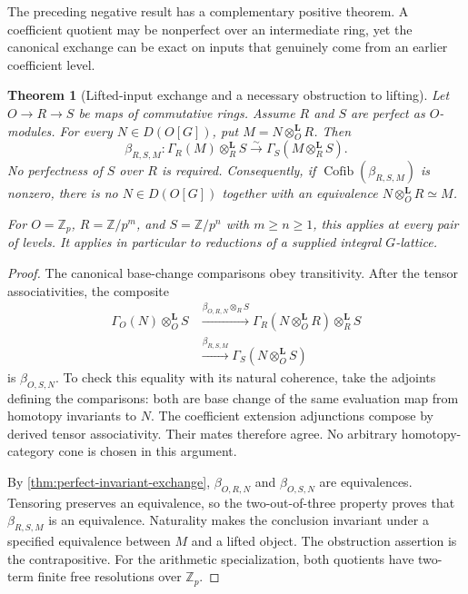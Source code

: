 \documentclass[11pt]{article}
\newtheorem{theorem}{Theorem}[section]
\theoremstyle{definition}
\theoremstyle{remark}
\newcommand{\Cofib}{\operatorname{Cofib}}
\begin{document}
The preceding negative result has a complementary positive theorem. A coefficient quotient may be nonperfect over an intermediate ring, yet the canonical exchange can be exact on inputs that genuinely come from an earlier coefficient level.

\begin{theorem}[Lifted-input exchange and a necessary obstruction to lifting]\label{thm:lifted-input-exchange}
Let $O\to R\to S$ be maps of commutative rings. Assume $R$ and $S$ are perfect as $O$-modules. For every $N\in D(O[G])$, put $M=N\otimes_O^{\mathbf L}R$. Then
\[
 \boxed{\beta_{R,S,M}:\Gamma_R(M)\otimes_R^{\mathbf L}S
 \xrightarrow{\sim}\Gamma_S(M\otimes_R^{\mathbf L}S).}
\]
No perfectness of $S$ over $R$ is required. Consequently, if $\Cofib(\beta_{R,S,M})$ is nonzero, there is no $N\in D(O[G])$ together with an equivalence $N\otimes_O^{\mathbf L}R\simeq M$.

For $O=\mathbb Z_p$, $R=\mathbb Z/p^m$, and $S=\mathbb Z/p^n$ with $m\geq n\geq1$, this applies at every pair of levels. It applies in particular to reductions of a supplied integral $G$-lattice.
\end{theorem}
\begin{proof}
The canonical base-change comparisons obey transitivity. After the tensor associativities, the composite
\[
 \begin{split}
 \Gamma_O(N)\otimes_O^{\mathbf L}S
 &\xrightarrow{\beta_{O,R,N}\otimes_R S}
 \Gamma_R(N\otimes_O^{\mathbf L}R)\otimes_R^{\mathbf L}S\\
 &\xrightarrow{\beta_{R,S,M}}
 \Gamma_S(N\otimes_O^{\mathbf L}S)
 \end{split}
\]
is $\beta_{O,S,N}$. To check this equality with its natural coherence, take the adjoints defining the comparisons: both are base change of the same evaluation map from homotopy invariants to $N$. The coefficient extension adjunctions compose by derived tensor associativity. Their mates therefore agree. No arbitrary homotopy-category cone is chosen in this argument.

By \cref{thm:perfect-invariant-exchange}, $\beta_{O,R,N}$ and $\beta_{O,S,N}$ are equivalences. Tensoring preserves an equivalence, so the two-out-of-three property proves that $\beta_{R,S,M}$ is an equivalence. Naturality makes the conclusion invariant under a specified equivalence between $M$ and a lifted object. The obstruction assertion is the contrapositive. For the arithmetic specialization, both quotients have two-term finite free resolutions over $\mathbb Z_p$.
\end{proof}
\end{document}
